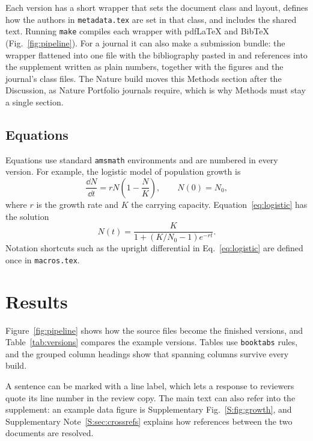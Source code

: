 Each version has a short wrapper that sets the document class and layout,
defines how the authors in \texttt{metadata.tex} are set in that class, and
includes the shared text. Running \texttt{make} compiles each wrapper with
pdfLaTeX and BibTeX (Fig.~\ref{fig:pipeline}). For a journal it can also make
a submission bundle: the wrapper flattened into one file with the bibliography
pasted in and references into the supplement written as plain numbers,
together with the figures and the journal's class files. The Nature build
moves this Methods section after the Discussion, as Nature Portfolio journals
require, which is why Methods must stay a single section.

\subsection{Equations}

Equations use standard \texttt{amsmath} environments and are numbered in every
version. For example, the logistic model of population growth
\citep{verhulst1838} is
\begin{equation}
  \frac{\dd N}{\dd t} = r N \left(1 - \frac{N}{K}\right),
  \qquad N(0) = N_0 ,
  \label{eq:logistic}
\end{equation}
where $r$ is the growth rate and $K$ the carrying capacity. Equation~\eqref{eq:logistic}
has the solution
\begin{equation}
  N(t) = \frac{K}{1 + \left(K/N_0 - 1\right) e^{-r t}} .
  \label{eq:solution}
\end{equation}
Notation shortcuts such as the upright differential in
Eq.~\eqref{eq:logistic} are defined once in \texttt{macros.tex}.

\section{Results}\label{sec:results}

Figure~\ref{fig:pipeline} shows how the source files become the finished
versions, and Table~\ref{tab:versions} compares the example versions. Tables
use \texttt{booktabs} rules, and the grouped column headings show that
spanning columns survive every build.

A sentence can be marked with a line label, which
lets a response to reviewers quote its line number in the review copy. The
main text can also refer into the supplement: an example data figure is
Supplementary Fig.~\ref{S:fig:growth}, and Supplementary
Note~\ref{S:sec:crossrefs} explains how references between the two documents
are resolved.

